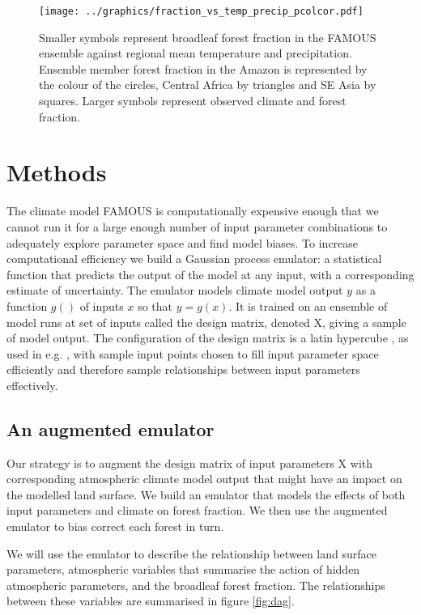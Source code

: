 \documentclass[gmd, manuscript]{copernicus}
\begin{document}
\begin{figure}[t]
\texttt{[image: ../graphics/fraction\_vs\_temp\_precip\_pcolcor.pdf]}
\caption{Smaller symbols represent broadleaf forest fraction in the FAMOUS ensemble against regional mean temperature and precipitation. Ensemble member forest fraction in the Amazon is represented by the colour of the circles, Central Africa by triangles and SE Asia by squares. Larger symbols represent observed climate and forest fraction.
}
\label{fig:fraction_vs_temp_precip_pcolcor}
\end{figure}


\section{Methods}
The climate model FAMOUS is computationally expensive enough that we cannot run it for a large enough number of input parameter combinations to adequately explore parameter space and find model biases. To increase computational efficiency we build a Gaussian process emulator: a statistical function that predicts the output of the model at any input, with a corresponding estimate of uncertainty. The emulator models climate model output $y$ as a function $g()$ of inputs $x$ so that $y = g(x)$. It is trained on an ensemble of model runs at set of inputs called the design matrix, denoted X, giving a sample of model output. The configuration of the design matrix is a latin hypercube \citep{mckay1979comparison}, as used in  e.g. \cite{gregoire2010optimal,williams2013optimising}, with sample input points chosen to fill input parameter space efficiently and therefore sample relationships between input parameters effectively.

\subsection{An augmented emulator}
Our strategy is to augment the design matrix of input parameters X with corresponding atmospheric climate model output that might have an impact on the modelled land surface. We build an emulator that models the effects of both input parameters and climate on forest fraction. We then use the augmented emulator to bias correct each forest in turn.

We will use the emulator to describe the relationship between land surface parameters, atmospheric variables that summarise the action of hidden atmospheric parameters, and the broadleaf forest fraction. The relationships between these variables are summarised in figure \ref{fig:dag}. 
\end{document}
